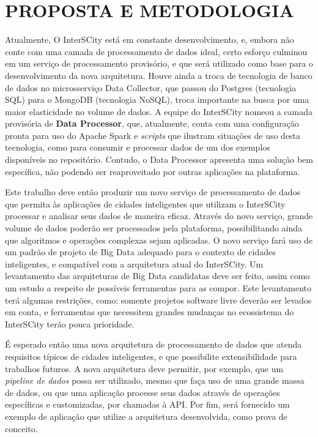 \section{PROPOSTA E METODOLOGIA}

Atualmente, O InterSCity está em constante desenvolvimento, e, embora não conte
com uma camada de processamento de dados ideal, certo esforço culminou em um
serviço de processamento provisório, e que será utilizado como base para o
desenvolvimento da nova arquitetura. Houve ainda a troca de tecnologia de banco
de dados no microsserviço Data Collector, que passou do Postgres (tecnologia
SQL) para o MongoDB (tecnologia NoSQL), troca importante na busca por uma maior
elasticidade no volume de dados. A equipe do InterSCity nomeou a camada
provisória de \textbf{Data Processor}, que, atualmente, conta com uma
configuração pronta para uso do Apache Spark e \textit{scripts} que ilustram
situações de uso desta tecnologia, como para consumir e processar dados de um
dos exemplos disponíveis no repositório. Contudo, o Data Processor apresenta
uma solução bem específica, não podendo ser reaproveitado por outras aplicações
na plataforma.

Este trabalho deve então produzir um novo serviço de processamento de dados que
permita às aplicações de cidades inteligentes que utilizam o InterSCity
processar e analisar seus dados de maneira eficaz. Através do novo serviço,
grande volume de dados poderão ser processados pela plataforma, possibilitando
ainda que algoritmos e operações complexas sejam aplicadas. O novo serviço fará
uso de um padrão de projeto de Big Data adequado para o contexto de cidades
inteligentes, e compatível com a arquitetura atual do InterSCity. Um
levantamento das arquiteturas de Big Data candidatas deve ser feito, assim
como um estudo a respeito de possíveis ferramentas para as compor. Este
levantamento terá algumas restrições, como: somente projetos software livre
deverão ser levados em conta, e ferramentas que necessitem grandes mudanças no
ecossistema do InterSCity terão pouca prioridade.

É esperado então uma nova arquitetura de processamento de dados que atenda
requisitos típicos de cidades inteligentes, e que possibilite extensibilidade
para trabalhos futuros. A nova arquitetura deve permitir, por exemplo, que um
\textit{pipeline de dados} possa ser utilizado, mesmo que faça uso de uma
grande massa de dados, ou que uma aplicação processe seus dados através de
operações específicas e customizadas, por chamadas à API. Por fim, será
fornecido um exemplo de aplicação que utilize a arquitetura desenvolvida, como
prova de conceito.
